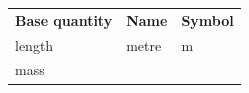 {{\begin{center}
\begin{xtabular}[t]{|l|l|l|}
    
        
                  \textbf{Base quantity}
                 &
    
    
        
                  \textbf{Name}
                 &
    
    
        
                  \textbf{Symbol}
     \tabularnewline{}
    
    
        length &
    
    
        metre &
    
    
        m%
     \tabularnewline{}
    
    
        mass &
    
    

\end{xtabular}
\end{center}}}
